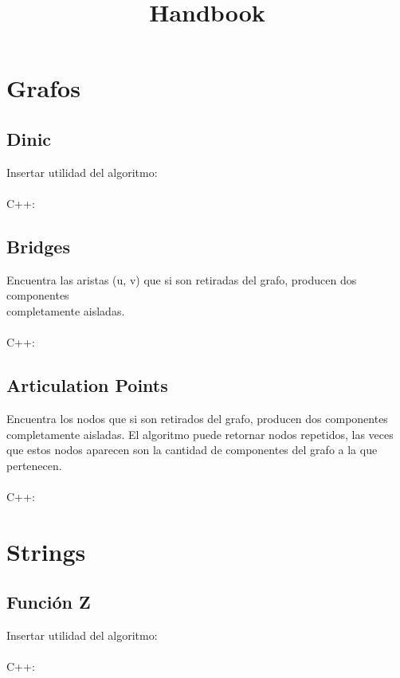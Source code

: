 \documentclass{article}
\title{Handbook}
\begin{document}
\maketitle
\tableofcontents
\pagebreak
\section{Grafos}
    \subsection{Dinic}
        Insertar utilidad del algoritmo:
        \\ \\
        C++:
        

    \subsection{Bridges}
        Encuentra las aristas (u, v) que si son retiradas del grafo, producen dos componentes \\
        completamente aisladas.
        \\ \\
        C++:
        

    \subsection{Articulation Points}
        Encuentra los nodos que si son retirados del grafo, producen dos componentes \\
        completamente aisladas. El algoritmo puede retornar nodos repetidos, las veces que
        estos nodos aparecen son la cantidad de componentes del grafo a la que pertenecen.
        \\ \\
        C++:
        

\pagebreak
\section{Strings}
    \subsection{Función Z}
        Insertar utilidad del algoritmo:
        \\ \\
        C++:
        
\end{document}
